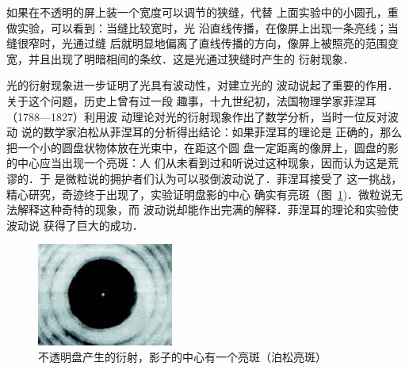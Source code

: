 如果在不透明的屏上装一个宽度可以调节的狭缝，代替
上面实验中的小圆孔，重做实验，可以看到：当缝比较宽时，光
沿直线传播，在像屏上出现一条亮线；当缝很窄时，光通过缝
后就明显地偏离了直线传播的方向，像屏上被照亮的范围变
宽，并且出现了明暗相间的条纹．这是光通过狭缝时产生的
衍射现象．

光的衍射现象进一步证明了光具有波动性，对建立光的
波动说起了重要的作用．关于这个问题，历史上曾有过一段
趣事，十九世纪初，法国物理学家菲涅耳（1788—1827）利用波
动理论对光的衍射现象作出了数学分析，当时一位反对波动
说的数学家泊松从菲涅耳的分析得出结论：如果菲涅耳的理论是
正确的，那么把一个小的圆盘状物体放在光束中，在距这个圆
盘一定距离的像屏上，圆盘的影的中心应当出现一个亮斑：人
们从未看到过和听说过这种现象，因而认为这是荒谬的．于
是微粒说的拥护者们认为可以驳倒波动说了．菲涅耳接受了
这一挑战，精心研究，奇迹终于出现了，实验证明盘影的中心
确实有亮斑（图~\ref{fig_C_6-8})．微粒说无法解释这种奇特的现象，而
波动说却能作出完满的解释．菲涅耳的理论和实验使波动说
获得了巨大的成功．

\begin{figure}[htbp]
    \centering
    \includegraphics{fig/C/6-8.jpg}
    \caption{不透明盘产生的衍射，影子的中心有一个亮斑（泊松亮斑）}\label{fig_C_6-8}
\end{figure}

